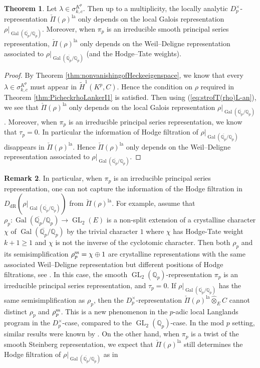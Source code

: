 \documentclass{article}
\theoremstyle{definition}
\newtheorem{theorem}{Theorem}[section]
\newtheorem{remark}[theorem]{Remark}
\def\bbQ{\mathbb{Q}}
\DeclareMathOperator{\Gal}{Gal}
\DeclareMathOperator{\GL}{GL}
\DeclareMathOperator{\dR}{dR}
\def\lan{\mathrm{la}}
\def\tilde{\widetilde}
\begin{document}
\begin{theorem}\label{thm:PS}
Let $\lambda\in \sigma_{k,c}^{K^p}$. Then up to a multiplicity, the locally analytic $D_p^\times$-representation $\check\Pi(\rho)^{\lan}$ only depends on the local Galois representation $\rho|_{\Gal(\overline{\bbQ_p}/\bbQ_p) }$. Moreover, when $\pi_p$ is an irreducible smooth principal series representation, $\check\Pi(\rho)^{\lan}$ only depends on the Weil--Deligne representation associated to $\rho|_{\Gal(\overline{\bbQ_p}/\bbQ_p)}$ (and the Hodge--Tate weights).
\begin{proof}
By Theorem \ref{thm:nonvanishingofHeckeeigenspace}, we know that every $\lambda\in \sigma_{k,c}^{K^p}$ must appear in $\tilde{H}^1(K^p,C)$. Hence the condition on $\rho$ required in Theorem \ref{thm:PicheckrhoLankerI1} is satisfied. Then using (\ref{eq:strofT(rho)L-an}), we see that $\check\Pi(\rho)^{\lan}$ only depends on the local Galois representation $\rho|_{\Gal(\overline{\bbQ_p}/\bbQ_p) }$. Moreover, when $\pi_p$ is an irreducible principal series representation, we know that $\tau_p=0$. In particular the information of Hodge filtration of $\rho|_{\Gal(\overline{\bbQ_p}/\bbQ_p) }$ disappears in $\check\Pi(\rho)^{\lan}$. Hence $\check\Pi(\rho)^{\lan}$ only depends on the Weil--Deligne representation associated to $\rho|_{\Gal(\overline{\bbQ_p}/\bbQ_p) }$.
\end{proof}
\end{theorem}
\begin{remark}\label{remarkordinary}
In particular, when $\pi_p$ is an irreducible principal series representation, one can not capture the information of the Hodge filtration in $D_{\dR}(\rho|_{\Gal(\overline{\bbQ_p}/\bbQ_p) })$ from $\check{\Pi}(\rho)^{\lan}$. For example, assume that $\rho_p:\Gal(\overline{\bbQ_p}/\bbQ_p)\rightarrow \GL_2(E)$ is a non-split extension of a crystalline character $\chi$ of $\Gal(\overline{\bbQ_p}/\bbQ_p)$ by the trivial character $1$ where $\chi$ has Hodge-Tate weight $k+1\geq 1$ and $\chi$ is not the inverse of the cyclotomic character. Then both $\rho_p$ and its semisimplification $\rho_p^{\rm ss}=\chi\oplus 1$ are crystalline representations with the same associated Weil--Deligne representation but different positions of Hodge filtrations, see \cite[\S 4.5]{Colmez2008Trianguline}. In this case, the smooth $\GL_2(\bbQ_p)$-representation $\pi_p$ is an irreducible principal series representation, and $\tau_p=0$. If $\rho|_{\Gal(\overline{\bbQ_p}/\bbQ_p) }$ has the same semisimplification as $\rho_p$, then the $D_p^{\times}$-representation $\check{\Pi}(\rho)^{\lan}\widehat{\otimes}_{E}C$ cannot distinct $\rho_p$ and $\rho_p^{\rm ss}$. This is a new phenomenon in the $p$-adic local Langlands program in the $D_p^\times$-case, compared to the $\GL_2(\bbQ_p)$-case. In the mod $p$ setting, similar results were known by \cite[Theorem 1.3(ii)(a)]{HuWang}. On the other hand, when $\pi_p$ is a twist of the smooth Steinberg representation, we expect that $\check{\Pi}(\rho)^{\lan}$ still determines the Hodge filtration of $\rho|_{\Gal(\overline{\bbQ_p}/\bbQ_p)}$ as in \cite[Remark 8.31]{HuWang}
\end{remark}
\end{document}
